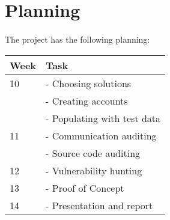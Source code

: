 \section{Planning}
\paragraph{}
The project has the following planning:

\center
\begin{tabular}{ | l| l | } 
\hline 
\textbf{Week} & \textbf{Task} \\
\hline
10 	& - Choosing solutions \\
    & - Creating accounts \\
    & - Populating with test data \\
\hline
11  & - Communication auditing \\
    & - Source code auditing \\
\hline
12  & - Vulnerability hunting \\ 
\hline
13  & - Proof of Concept \\ 
\hline
14  & - Presentation and report \\ 
\hline
\end{tabular}
\label{tab:planning}
\flushleft